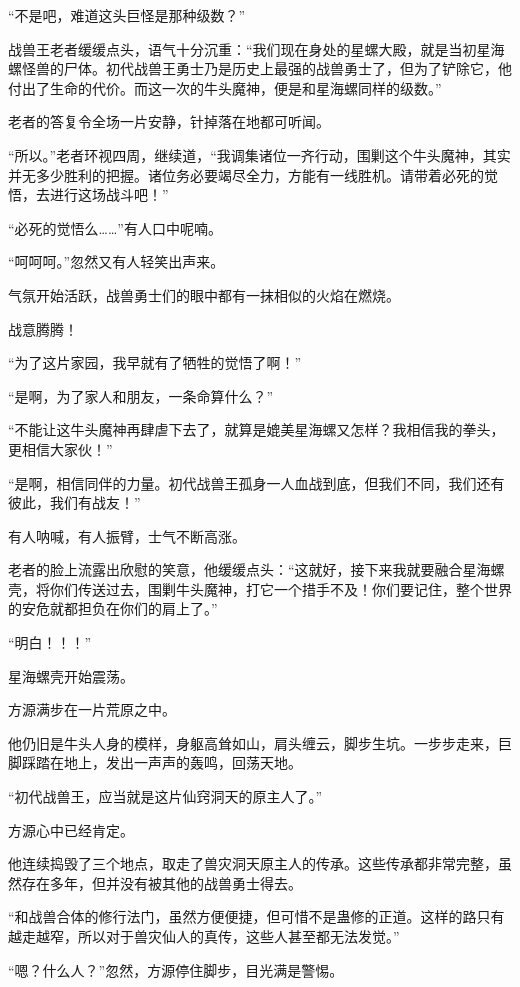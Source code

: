 \begin{this_body}
“不是吧，难道这头巨怪是那种级数？”

战兽王老者缓缓点头，语气十分沉重：“我们现在身处的星螺大殿，就是当初星海螺怪兽的尸体。初代战兽王勇士乃是历史上最强的战兽勇士了，但为了铲除它，他付出了生命的代价。而这一次的牛头魔神，便是和星海螺同样的级数。”

老者的答复令全场一片安静，针掉落在地都可听闻。

“所以。”老者环视四周，继续道，“我调集诸位一齐行动，围剿这个牛头魔神，其实并无多少胜利的把握。诸位务必要竭尽全力，方能有一线胜机。请带着必死的觉悟，去进行这场战斗吧！”

“必死的觉悟么……”有人口中呢喃。

“呵呵呵。”忽然又有人轻笑出声来。

气氛开始活跃，战兽勇士们的眼中都有一抹相似的火焰在燃烧。

战意腾腾！

“为了这片家园，我早就有了牺牲的觉悟了啊！”

“是啊，为了家人和朋友，一条命算什么？”

“不能让这牛头魔神再肆虐下去了，就算是媲美星海螺又怎样？我相信我的拳头，更相信大家伙！”

“是啊，相信同伴的力量。初代战兽王孤身一人血战到底，但我们不同，我们还有彼此，我们有战友！”

有人呐喊，有人振臂，士气不断高涨。

老者的脸上流露出欣慰的笑意，他缓缓点头：“这就好，接下来我就要融合星海螺壳，将你们传送过去，围剿牛头魔神，打它一个措手不及！你们要记住，整个世界的安危就都担负在你们的肩上了。”

“明白！！！”

星海螺壳开始震荡。

方源满步在一片荒原之中。

他仍旧是牛头人身的模样，身躯高耸如山，肩头缠云，脚步生坑。一步步走来，巨脚踩踏在地上，发出一声声的轰鸣，回荡天地。

“初代战兽王，应当就是这片仙窍洞天的原主人了。”

方源心中已经肯定。

他连续捣毁了三个地点，取走了兽灾洞天原主人的传承。这些传承都非常完整，虽然存在多年，但并没有被其他的战兽勇士得去。

“和战兽合体的修行法门，虽然方便便捷，但可惜不是蛊修的正道。这样的路只有越走越窄，所以对于兽灾仙人的真传，这些人甚至都无法发觉。”

“嗯？什么人？”忽然，方源停住脚步，目光满是警惕。


\end{this_body}

